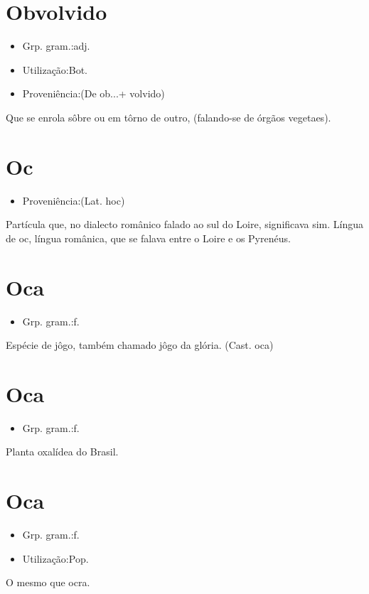 \section{Obvolvido}
\begin{itemize}
\item {Grp. gram.:adj.}
\end{itemize}
\begin{itemize}
\item {Utilização:Bot.}
\end{itemize}
\begin{itemize}
\item {Proveniência:(De \textunderscore ob...\textunderscore  + \textunderscore volvido\textunderscore )}
\end{itemize}
Que se enrola sôbre ou em tôrno de outro, (falando-se de órgãos vegetaes).
\section{Oc}
\begin{itemize}
\item {Proveniência:(Lat. \textunderscore hoc\textunderscore )}
\end{itemize}
Partícula que, no dialecto românico falado ao sul do Loire, significava \textunderscore sim\textunderscore .
\textunderscore Língua de oc\textunderscore , língua românica, que se falava entre o Loire e os Pyrenéus.
\section{Oca}
\begin{itemize}
\item {Grp. gram.:f.}
\end{itemize}
Espécie de jôgo, também chamado jôgo da glória.
(Cast. \textunderscore oca\textunderscore )
\section{Oca}
\begin{itemize}
\item {Grp. gram.:f.}
\end{itemize}
Planta oxalídea do Brasil.
\section{Oca}
\begin{itemize}
\item {Grp. gram.:f.}
\end{itemize}
\begin{itemize}
\item {Utilização:Pop.}
\end{itemize}
O mesmo que \textunderscore ocra\textunderscore .
